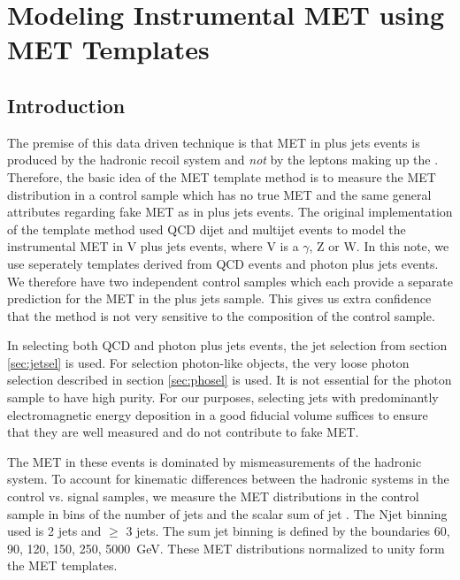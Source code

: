 
\section{Modeling Instrumental MET using MET Templates}
\label{sec:templates}

\subsection{Introduction}

The premise of this data driven technique is that MET in \Z plus jets events
is produced by the hadronic recoil system and {\it not} by the leptons making up the \Z.
Therefore, the basic idea of the MET template method is to measure the MET distribution in 
a control sample which has no true MET and the same general attributes regarding
fake MET as in \Z plus jets events.
The original implementation of the template method used QCD dijet and multijet events
to model the instrumental MET in 
V plus jets events, where V is a $\gamma$, Z or W.
In this note, we use seperately templates derived from QCD events and photon plus
jets events. We therefore have two independent control samples which each provide
a separate prediction for the MET in the \Z plus jets sample. This gives us extra
confidence that the method is not very sensitive to the composition of the control
sample.

In selecting both QCD and photon plus jets events, 
the jet selection from section \ref{sec:jetsel} is used.
For selection photon-like objects, the very loose photon selection described in section
\ref{sec:phosel} is used.
It is not essential for the photon sample to have high purity.
For our purposes, selecting jets with predominantly 
electromagnetic energy deposition in a good fiducial volume suffices to ensure that 
they are well measured and do not contribute to fake MET.

The MET in these events is dominated by mismeasurements of the hadronic system. 
To account for kinematic differences between the hadronic systems in the control vs. signal 
samples, we measure the MET distributions in the control sample in bins of the number of jets 
and the scalar sum of jet \pt. 
The Njet binning used is 2 jets and $\ge$ 3 jets. 
The sum jet \pt binning is defined by the boundaries {60, 90, 120, 150, 250, 5000}~GeV.
These MET distributions normalized to unity form the MET templates.


